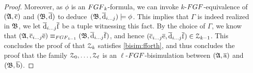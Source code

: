 \begin{proof}
Moreover, as $\phi$ is an $\FGF_{\mathit{k}}$-formula,
we can invoke $\mathit{k}$-$\FGF$-equivalence of $({\mathfrak{A}}, \overline{\mathrm{c}})$ and $({\mathfrak{B}}, \overline{\mathrm{d}})$ to deduce~$({\mathfrak{B}}, \overline{\mathrm{d}}_{i\ldots j}) \models \phi$.
This implies that $\Gamma$ is indeed realized in ${\mathfrak{B}}$, we let $\overline{\mathrm{d}}_{i\ldots j}\overline{\mathrm{f}}$ be a tuple witnessing this fact.
By the choice of $\Gamma$, we know that  $(\str{A}, \elemtuplecfromto{i}{j}\elemtuplee) \equiv_{\FGF_{\mathit{k}{-}1}} (\str{B}, \elemtupledfromto{i}{j}\elemtuplef)$, and hence
$(\overline{\mathrm{c}}_{i\ldots j}\overline{\mathrm{e}}, \overline{\mathrm{d}}_{i\ldots j}\overline{\mathrm{f}}) \in \mathcal{Z}_{\mathit{k}{-}1}$.
This concludes the proof of that $\mathcal{Z}_{\mathit{k}}$ satisfies \ref{bisim:fforth}, and thus concludes the proof that the family $\mathcal{Z}_0, \ldots, \mathcal{Z}_\ell$ is an $\ell$-$\FGF$-bisimulation between $({\mathfrak{A}}, \overline{\mathrm{a}})$ and $({\mathfrak{B}}, \overline{\mathrm{b}})$.
\end{proof}
\fi
